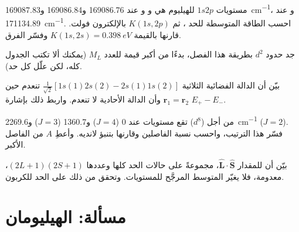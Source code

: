 \begin{exercise}[$\star\star$]\label{exo:b3:many-electron-atoms:8}
مستويات $1s2p$ للهيليوم هي  و
و عند 169086.76 و169086.84 و\qty{169087.83}{cm^{-1}}، 
و عند \qty{171134.89}{cm^{-1}}. احسب الطاقة المتوسطة
للحد ، ثم $K(1s,2p)$ بالإلكترون فولت. قارنها بالقيمة $K(1s,2s) = \qty{0.398}{eV}$
وفسّر الفرق.
\end{exercise}

\begin{exercise}[$\star\star$]\label{exo:b3:many-electron-atoms:9}
جد حدود $d^2$ بطريقة هذا الفصل، بدءًا من
أكبر قيمة للعدد $M_L$ (يمكنك ألا تكتب الجدول كله، لكن علّل كل حد).
\end{exercise}

\begin{exercise}[$\star\star\star$]\label{exo:b3:many-electron-atoms:10}
بيّن أن الدالة الفضائية الثلاثية $\frac{1}{\sqrt2}[1s(1)2s(2) -
2s(1)1s(2)]$ تنعدم حين $\mathbf r_1 = \mathbf r_2$ وأن الدالة الأحادية
لا تنعدم. واربط ذلك بإشارة $E_+ - E_-$.
\end{exercise}

\begin{exercise}[$\star\star\star$]\label{exo:b3:many-electron-atoms:11}
من أجل  ($d^8$) تقع مستويات  عند 0 ($J = 4$) و1360.7 ($J = 3$)
و\qty{2269.6}{cm^{-1}} ($J = 2$). فسّر هذا الترتيب، واحسب نسبة
الفاصلين وقارنها بتنبؤ لانديه. وأعطِ $A$ من الفاصل
الأكبر.
\end{exercise}

\begin{exercise}[$\star\star\star$]\label{exo:b3:many-electron-atoms:12}
بيّن أن  للمقدار $\hat{\mathbf L}\cdot\hat{\mathbf S}$، مجموعةً
على حالات الحد كلها وعددها $(2L+1)(2S+1)$، معدومة، فلا يغيّر  المتوسط المرجَّح للمستويات. وتحقق من ذلك على
الحد  للكربون.
\end{exercise}

\section{مسألة: الهيليومان}


